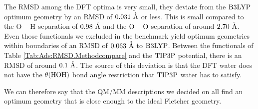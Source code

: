 The RMSD among the DFT optima is very small, they deviate from the
$\text{B3LYP}$ optimum geometry by an RMSD of $0.031~\mathring{\text{A}}$ or less. This is small
compared to the $\text O - \text H$ separation of $0.98~\mathring{\text{A}}$ and the $\text O - \text
O$ separation of around $2.70~\mathring{\text{A}}$. Even those functionals we excluded in the
benchmark yield optimum geometries within boundaries of an RMSD of $0.063~\mathring{\text{A}}$ to $\text{B3LYP}$. Between the functionals of Table \ref{Tab:Ads:RMSD.Methodcompare} and the $\text{TIP3P}$ potential,
there is an RMSD of around $0.1~\mathring{\text{A}}$. The source of this deviation is that the
DFT water does not have the $\theta(\text{HOH})$ bond angle restriction that $\text{TIP3P}$ water
has to satisfy.

We can therefore say that the QM/MM descriptions we decided on all find an
optimum geometry that is close enough to the ideal Fletcher geometry. 

